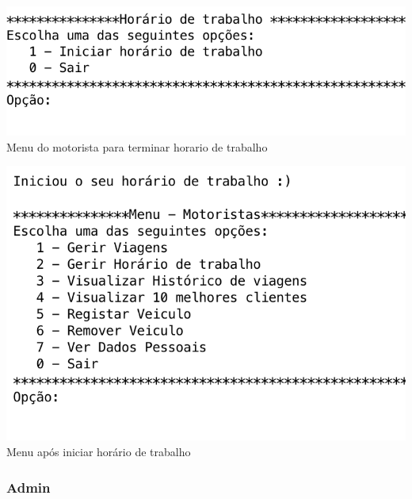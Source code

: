 \noindent\begin{minipage}[b]{.4\textwidth}
	\includegraphics[scale=0.55]{imagem/iniciarHorarioTrabalho}
	\small{Menu do motorista para terminar horario de trabalho}
\end{minipage} 
\hfill
\begin{minipage}[b]{.4\textwidth}
	\includegraphics[scale=0.5]{imagem/iniciouHorarioTrabalho}
	\small{Menu após iniciar horário de trabalho}
\end{minipage}
\hfill


\subsubsection{Admin}

